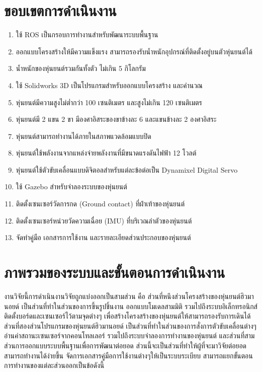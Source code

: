 \section{ขอบเขตการดำเนินงาน}
\begin{enumerate}[label=\arabic*, leftmargin=1.5cm]
	\setlength\itemsep{-0.25em}
	\item ใช้ ROS เป็นกรอบการทำงานสำหรับพัฒนาระบบพื้นฐาน
	\item ออกแบบโครงสร้างให้มีความแข็งแรง สามารถรองรับน้ำหนักอุปกรณ์ที่ติดตั้งอยู่บนตัวหุ่นยนต์ได้
	\item น้ำหนักของหุ่นยนต์รวมกันทั้งตัว ไม่เกิน 5 กิโลกรัม
	\item ใช้ Solidworks 3D เป็นโปรแกรมสำหรับออกแบบโครงสร้าง และคำนวณ
	\item หุ่นยนต์มีความสูงไม่ต่ำกว่า 100 เซนติเมตร และสูงไม่เกิน 120 เซนติเมตร
	\item หุ่นยนต์มี 2 แขน 2 ขา มีองศาอิสระของขาข้างละ 6 และแขนข้างละ 2 องศาอิสระ
	\item หุ่นยนต์สามารถทำงานได้ภายในสภาพแวดล้อมแบบปิด
	\item หุ่นยนต์ใช้พลังงานจากแหล่งจ่ายพลังงานที่มีขนาดแรงดันไฟฟ้า 12 โวลต์
	\item หุ่นยนต์ใช้ตัวขับเคลื่อนแบบดิจิตอลสำหรับแต่ละข้อต่อเป็น Dynamixel Digital Servo
	\item ใช้ Gazebo สำหรับจำลองระบบของหุ่นยนต์
	\item ติดตั้งเซนเซอร์วัดการกด (Ground contact) ที่ฝ่าเท้าของหุ่นยนต์
	\item ติดตั้งเซนเซอร์หน่วยวัดความเฉื่อย (IMU) ที่บริเวณลำตัวของหุ่นยนต์
	\item จัดทำคู่มือ เอกสารการใช้งาน และรายละเอียดส่วนประกอบของหุ่นยนต์
\end{enumerate}

\clearpage
\section{ภาพรวมของระบบและขั้นตอนการดำเนินงาน}
งานวิจัยนี้การดำเนินงานวิจัยถูกแบ่งออกเป็นสามส่วน คือ ส่วนที่หนึงส่วนโครงสร้างของหุ่นยนต์ฮิวมานอยด์ เป็นส่วนที่ทำในส่วนของการขึ้นรูปชิ้นงาน
ออกแบบโมเดลสามมิติ รวมไปถึงระบบอิเล็กทรอนิกส์ ติดตั้งบอร์ดและเซนเซอร์ไว้ตามจุดต่างๆ เพื่อสร้างโครงสร้างของหุ่นยนต์ให้สามารถรองรับการเดินได้
ส่วนที่สองส่วนโปรแกรมของหุ่นยนต์ฮิวมานอยด์ เป็นส่วนที่ทำในส่วนของการสั่งการตัวขับเคลื่อนต่างๆ อ่านค่าสถานะเซนเซอร์จากคอนโทลเลอร์
รวมไปถึงระบบจำลองการทำงานของหุ่นยนต์ และส่วนที่สามส่วนการออกแบบระบบพื้นฐานเพื่อการพัฒนาต่อยอด ส่วนนี้จะเป็นส่วนที่ทำให้ผู้ที่จะมาวิจัยต่อยอดสามารถทำงานได้ง่ายขึ้น
จัดการเอกสารคู่มือการใช้งานต่างๆให้เป็นระบบระเบียบ สามารถแยกขั้นตอนการทำงานของแต่ละส่วนออกเป็นข้อดังนี้

